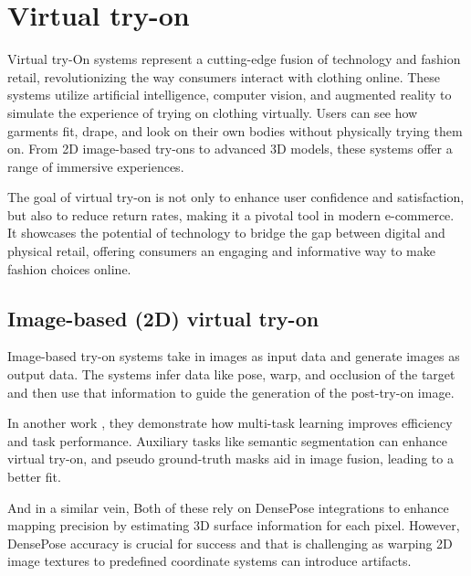\section{\textbf{Virtual try-on}} \label{section:vton}
	Virtual try-On systems represent a cutting-edge fusion of technology and fashion retail, revolutionizing the way consumers interact with clothing online. These systems utilize artificial intelligence, computer vision, and augmented reality to simulate the experience of trying on clothing virtually. Users can see how garments fit, drape, and look on their own bodies without physically trying them on. From 2D image-based try-ons to advanced 3D models, these systems offer a range of immersive experiences.
	
	The goal of virtual try-on is not only to enhance user confidence and satisfaction, but also to reduce return rates, making it a pivotal tool in modern e-commerce. It showcases the potential of technology to bridge the gap between digital and physical retail, offering consumers an engaging and informative way to make fashion choices online.

	\subsection{\textbf{Image-based (2D) virtual try-on}}
		Image-based try-on systems take in images as input data and generate images as output data. The systems infer data like pose, warp, and occlusion of the target and then use that information to guide the generation of the post-try-on image.

		 In another work \cite{DBLP:conf/iccvw/AyushJCK19}, they demonstrate how multi-task learning improves efficiency and task performance. Auxiliary tasks like semantic segmentation can enhance virtual try-on, and pseudo ground-truth masks aid in image fusion, leading to a better fit.
		
		 And in a similar vein,  Both of these rely on DensePose integrations to enhance mapping precision by estimating 3D surface information for each pixel. However, DensePose accuracy is crucial for success and that is challenging as warping 2D image textures to predefined coordinate systems can introduce artifacts.

